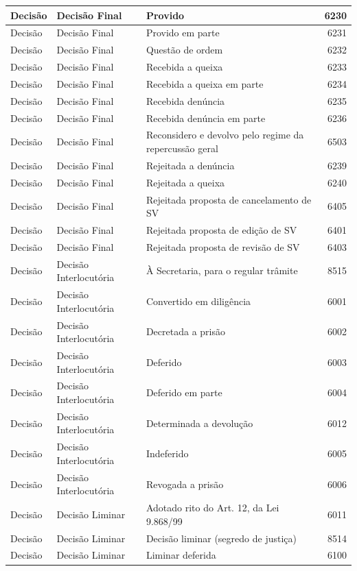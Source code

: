 \documentclass[
]{book}
\begin{document}
\begin{tabular}{l|l|l|r}
\hline
Decisão & Decisão Final & Provido & 6230\\
\hline
Decisão & Decisão Final & Provido em parte & 6231\\
\hline
Decisão & Decisão Final & Questão de ordem & 6232\\
\hline
Decisão & Decisão Final & Recebida a queixa & 6233\\
\hline
Decisão & Decisão Final & Recebida a queixa em parte & 6234\\
\hline
Decisão & Decisão Final & Recebida denúncia & 6235\\
\hline
Decisão & Decisão Final & Recebida denúncia em parte & 6236\\
\hline
Decisão & Decisão Final & Reconsidero e devolvo pelo regime da repercussão geral & 6503\\
\hline
Decisão & Decisão Final & Rejeitada a denúncia & 6239\\
\hline
Decisão & Decisão Final & Rejeitada a queixa & 6240\\
\hline
Decisão & Decisão Final & Rejeitada proposta de cancelamento de SV & 6405\\
\hline
Decisão & Decisão Final & Rejeitada proposta de edição de SV & 6401\\
\hline
Decisão & Decisão Final & Rejeitada proposta de revisão de SV & 6403\\
\hline
Decisão & Decisão Interlocutória & À Secretaria, para o regular trâmite & 8515\\
\hline
Decisão & Decisão Interlocutória & Convertido em diligência & 6001\\
\hline
Decisão & Decisão Interlocutória & Decretada a prisão & 6002\\
\hline
Decisão & Decisão Interlocutória & Deferido & 6003\\
\hline
Decisão & Decisão Interlocutória & Deferido em parte & 6004\\
\hline
Decisão & Decisão Interlocutória & Determinada a devolução & 6012\\
\hline
Decisão & Decisão Interlocutória & Indeferido & 6005\\
\hline
Decisão & Decisão Interlocutória & Revogada a prisão & 6006\\
\hline
Decisão & Decisão Liminar & Adotado rito do Art. 12, da Lei 9.868/99 & 6011\\
\hline
Decisão & Decisão Liminar & Decisão liminar (segredo de justiça) & 8514\\
\hline
Decisão & Decisão Liminar & Liminar deferida & 6100\\

\end{tabular}
\end{document}
